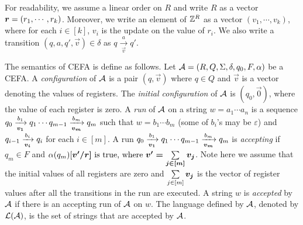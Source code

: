 For readability, we assume a linear order on $R$ and write $R$ as a vector $\myvec{r} = (r_1, \cdots, r_k)$. Moreover, we write an element of $\mathbb{Z}^R$ as a vector $(v_1, \cdots, v_k)$, where for each $i \in [k]$, $v_i$ is the update on the value of $r_i$. We also write a transition $(q, a, q', \vec{v}) \in \delta$ as $q \xrightarrow[\vec{v}]{a} q'$.



The semantics of CEFA is define as follows. Let $\mathcal{A} = (R, Q, \Sigma, \delta, q_0, F, \alpha)$ be a CEFA. 
A \emph{configuration} of $\mathcal{A}$ is a pair $(q, \vec{v})$ where $q \in Q$ and $\vec{v}$ is a vector denoting the values of registers.  
The \emph{initial configuration} of $\mathcal{A}$ is $(q_0, \vec{0})$, where the value of each register is zero. 
A \emph{run} of $\mathcal{A}$ on a string $w = a_1 \cdots a_n$ is a sequence $q_0 \xrightarrow[\myvec{v_1}]{b_1} q_1 \cdots q_{m-1}\xrightarrow[\myvec{v_m}]{b_m} q_m$ such that $w = b_1 \cdots b_m$ (some of $b_i$'s may be $\varepsilon$) and $q_{i-1} \xrightarrow[\myvec{v_i}]{b_i} q_i$ for each $i \in [m]$. A run $q_0 \xrightarrow[\myvec{v_1}]{b_1} q_1 \cdots q_{m-1}\xrightarrow[\myvec{v_m}]{b_m} q_m$ is \emph{accepting} if $q_m \in F$ and $\alpha(q_m)[\myvec{\myvec{v'}/\myvec{r}]$ is true, where $\myvec{v'} = \sum \limits_{j \in [m]} \myvec{v_j}}$. Note here we assume that the initial values of all registers are zero and $\sum \limits_{j \in [m]} \myvec{v_j}$ is the vector of register values after all the transitions in the run are executed. A string $w$ is \emph{accepted} by $\mathcal{A}$ if there is an accepting run of $\mathcal{A}$ on $w$. The language defined by $\mathcal{A}$, denoted by $\mathcal{L}(\mathcal{A})$, is the set of strings that are accepted by $\mathcal{A}$. 


